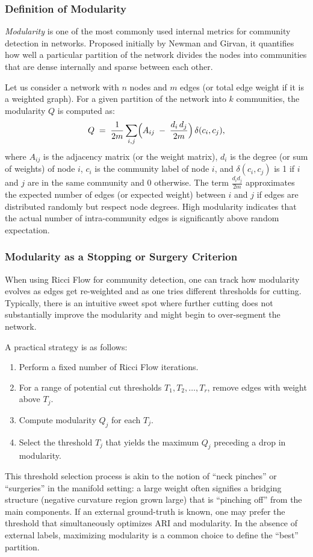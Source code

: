 \subsubsection{Definition of Modularity}
\emph{Modularity} is one of the most commonly used internal metrics for community detection in networks. Proposed initially by Newman and Girvan, it quantifies how well a particular partition of the network divides the nodes into communities that are dense internally and sparse between each other.

Let us consider a network with $n$ nodes and $m$ edges (or total edge weight if it is a weighted graph). For a given partition of the network into $k$ communities, the modularity $Q$ is computed as:
\begin{equation}
Q \;=\;\frac{1}{2m} \sum_{i,j}\Bigl(A_{ij} \;-\;\frac{d_i\,d_j}{2m}\Bigr) \,\delta(c_i, c_j),
\end{equation}
where $A_{ij}$ is the adjacency matrix (or the weight matrix), $d_i$ is the degree (or sum of weights) of node $i$, $c_i$ is the community label of node $i$, and $\delta(c_i, c_j)$ is 1 if $i$ and $j$ are in the same community and 0 otherwise. The term $\frac{d_i d_j}{2m}$ approximates the expected number of edges (or expected weight) between $i$ and $j$ if edges are distributed randomly but respect node degrees. High modularity indicates that the actual number of intra-community edges is significantly above random expectation.

\subsubsection{Modularity as a Stopping or Surgery Criterion}
When using Ricci Flow for community detection, one can track how modularity evolves as edges get re-weighted and as one tries different thresholds for cutting. Typically, there is an intuitive sweet spot where further cutting does not substantially improve the modularity and might begin to over-segment the network. 

A practical strategy is as follows:
\begin{enumerate}
    \item Perform a fixed number of Ricci Flow iterations. 
    \item For a range of potential cut thresholds $T_1, T_2, \dots, T_r$, remove edges with weight above $T_j$. 
    \item Compute modularity $Q_j$ for each $T_j$.
    \item Select the threshold $T_j$ that yields the maximum $Q_j$ preceding a drop in modularity.
\end{enumerate}
This threshold selection process is akin to the notion of “neck pinches” or “surgeries” in the manifold setting: a large weight often signifies a bridging structure (negative curvature region grown large) that is “pinching off” from the main components. If an external ground-truth is known, one may prefer the threshold that simultaneously optimizes ARI and modularity. In the absence of external labels, maximizing modularity is a common choice to define the “best” partition.

